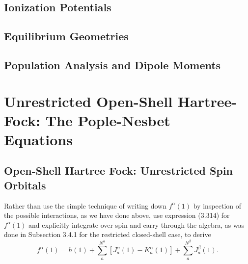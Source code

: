 \documentclass[a4paper]{book}
\newcounter{exercise}[chapter]
\begin{document}
	\subsection{Ionization Potentials}
	
	\subsection{Equilibrium Geometries}
	
	\subsection{Population Analysis and Dipole Moments}
	
	\section{Unrestricted Open-Shell Hartree-Fock: The Pople-Nesbet \texorpdfstring{\\}- Equations}
	
	\subsection{Open-Shell Hartree Fock: Unrestricted Spin Orbitals}

	\begin{exercise}
	Rather than use the simple technique of writing down $f^\alpha(1)$ by inspection of the possible interactions, as we have done above, use expression (3.314) for $f^\alpha(1)$  and explicitly integrate over spin and carry through the algebra, as was done in Subsection 3.4.1 for the restricted closed-shell case, to derive
	\[
		f^\alpha(1) = h(1) + \sum_a^{N^\alpha} \left[ J^\alpha_a(1) - K^\alpha_a(1) \right] + \sum_a^{N^\beta} J^\beta_a(1).
	\]
	\end{exercise}
	
\end{document}
